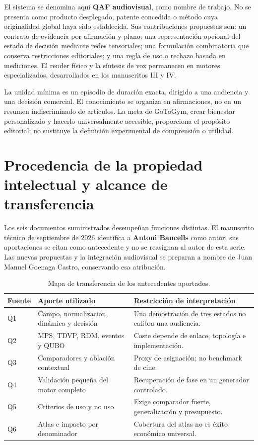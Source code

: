 El sistema se denomina aquí \textbf{QAF audiovisual}, como nombre de trabajo. No se presenta como producto desplegado, patente concedida o método cuya originalidad global haya sido establecida. Sus contribuciones propuestas son: un contrato de evidencia por afirmación y plano; una representación opcional del estado de decisión mediante redes tensoriales; una formulación combinatoria que conserva restricciones editoriales; y una regla de uso o rechazo basada en mediciones. El render físico y la síntesis de voz permanecen en motores especializados, desarrollados en los manuscritos III y IV.

La unidad mínima es un episodio de duración exacta, dirigido a una audiencia y una decisión comercial. El conocimiento se organiza en afirmaciones, no en un resumen indiscriminado de artículos. La meta de GoToGym, crear bienestar personalizado y hacerlo universalmente accesible, proporciona el propósito editorial; no sustituye la definición experimental de comprensión o utilidad.

\section{Procedencia de la propiedad intelectual y alcance de transferencia}
Los seis documentos suministrados desempeñan funciones distintas. El manuscrito técnico de septiembre de 2026 identifica a \textbf{Antoni Bancells} como autor; sus aportaciones se citan como antecedente y no se reasignan al autor de esta serie. Las nuevas propuestas y la integración audiovisual se preparan a nombre de Juan Manuel Goenaga Castro, conservando esa atribución.

\begin{table}[ht]\centering\compacttable
\begin{tabular}{p{.07\linewidth}p{.37\linewidth}p{.46\linewidth}}\toprule
Fuente & Aporte utilizado & Restricción de interpretación \\\midrule
Q1 & Campo, normalización, dinámica y decisión & Una demostración de tres estados no calibra una audiencia.\\
Q2 & MPS, TDVP, RDM, eventos y QUBO & Coste depende de enlace, topología e implementación.\\
Q3 & Comparadores y ablación contextual & Proxy de asignación; no benchmark de cine.\\
Q4 & Validación pequeña del motor completo & Recuperación de fase en un generador controlado.\\
Q5 & Criterios de uso y no uso & Exige comparador fuerte, generalización y presupuesto.\\
Q6 & Atlas e impacto por denominador & Cobertura del atlas no es éxito económico universal.\\\bottomrule
\end{tabular}\caption{Mapa de transferencia de los antecedentes aportados.}
\end{table}

